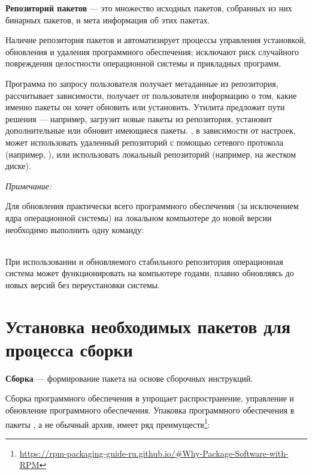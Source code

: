 \textbf{Репозиторий пакетов} --- это множество исходных пакетов, собранных из них бинарных пакетов, и мета информация об этих пакетах.

Наличие репозитория пакетов и  автоматизирует процессы управления установкой, обновления и удаления программного обеспечения; исключают риск случайного повреждения целостности операционной системы и прикладных программ.

Программа  по запросу пользователя получает метаданные из репозитория, рассчитывает зависимости, получает от пользователя информацию о том, какие именно пакеты он хочет обновить или установить. Утилита предложит пути решения --- например, загрузит новые пакеты из репозитория, установит дополнительные или обновит имеющиеся пакеты. , в зависимости от настроек, может использовать удаленный репозиторий с помощью сетевого протокола (например, ), или использовать локальный репозиторий (например, на жестком диске).

\noindent 
\begin{minipage}[b]{0.25\textwidth}
	\vspace{1cm}
	\textit{Примечание:}
\end{minipage}
\hspace{0.05\textwidth}
\begin{minipage}{0.7\textwidth}
	Для обновления практически всего программного обеспечения (за исключением ядра операционной системы) на локальном компьютере до новой версии необходимо выполнить одну команду:\\
	\\
\end{minipage}
\vspace{0.6cm}

При использовании  и обновляемого стабильного репозитория операционная система может функционировать на компьютере годами, плавно обновляясь до новых версий без переустановки системы. 

\section{Установка необходимых пакетов для процесса сборки}
\textbf{Сборка} --- формирование пакета на основе сборочных инструкций.

Сборка программного обеспечения в  упрощает распространение, управление и обновление программного обеспечения. Упаковка программного обеспечения в пакеты , а не обычный архив, имеет ряд преимуществ\footnote{\href{https://rpm-packaging-guide-ru.github.io/\#Why-Package-Software-with-RPM}{https://rpm-packaging-guide-ru.github.io/\#Why-Package-Software-with-RPM}}:

